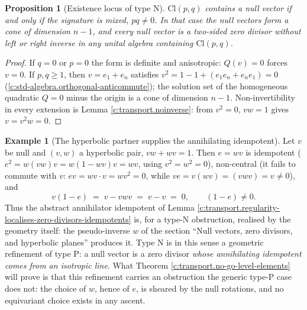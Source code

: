 \documentclass[11pt]{article}
\newtheorem{proposition}[theorem]{Proposition}
\theoremstyle{definition}
\newtheorem{example}[theorem]{Example}
\theoremstyle{plain}
\providecommand{\Cl}{}\renewcommand{\Cl}{\mathrm{Cl}}
\begin{document}
\begin{proposition}[Existence locus of type N]\label{c:transport.existence-locus-type-n}
$\Cl(p,q)$ contains a null vector if and only if the signature is mixed, $pq \neq 0$. In that case the null vectors form a cone of dimension $n - 1$, and every null vector is a two-sided zero divisor without left or right inverse in any unital algebra containing $\Cl(p,q)$.
\end{proposition}
\begin{proof}
If $q = 0$ or $p = 0$ the form is definite and anisotropic: $Q(v) = 0$ forces $v = 0$. If $p, q \geq 1$, then $v = e_1 + e_n$ satisfies $v^2 = 1 - 1 + (e_1e_n + e_ne_1) = 0$ (\ref{c:std-algebra.orthogonal-anticommute}); the solution set of the homogeneous quadratic $Q = 0$ minus the origin is a cone of dimension $n-1$. Non-invertibility in every extension is Lemma \ref{c:transport.noinverse}: from $v^2 = 0$, $vw = 1$ gives $v = v^2 w = 0$.

\end{proof}

\begin{example}[The hyperbolic partner supplies the annihilating idempotent]\label{c:note.transport.hyperbolic-partner-supplies-annihilating-idempotent}
Let $v$ be null and $(v, w)$ a hyperbolic pair, $vw + wv = 1$. Then $e = wv$ is idempotent ($e^2 = w(vw)v = w(1 - wv)v = wv$, using $v^2 = w^2 = 0$), non-central (it fails to commute with $v$: $ev = wv\cdot v = wv^2 = 0$, while $ve = v(wv) = (vwv) = v \neq 0$), and
\[
v(1 - e)\;=\;v - vwv \;=\; v - v \;=\; 0 , \qquad (1-e) \ne 0.
\]
Thus the abstract annihilator idempotent of Lemma \ref{c:transport.regularity-localises-zero-divisors-idempotents} is, for a type-N obstruction, realised by the geometry itself: the pseudo-inverse $w$ of the section ``Null vectors, zero divisors, and hyperbolic planes'' produces it. Type N is in this sense a geometric refinement of type P: a null vector is a zero divisor \emph{whose annihilating idempotent comes from an isotropic line}. What Theorem \ref{c:transport.no-go-level-elements} will prove is that this refinement carries an obstruction the generic type-P case does not: the choice of $w$, hence of $e$, is sheared by the null rotations, and no equivariant choice exists in any ascent.
\end{example}
\end{document}
